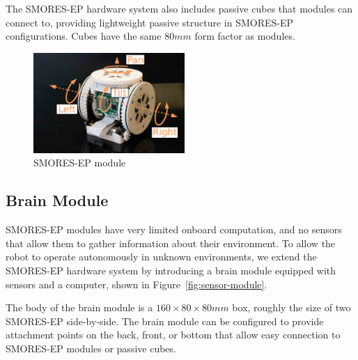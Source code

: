 \documentclass[conference]{IEEEtran}
\begin{document}
The SMORES-EP hardware system also includes passive cubes that modules can connect to, providing lightweight passive structure in SMORES-EP configurations.  Cubes have the same $80mm$ form factor as modules.
%
\begin{figure}   
\begin{center}
\includegraphics[height=1.5in]{images/smores_dof.pdf}
\end{center}
\caption{SMORES-EP module}
\label{fig:smores-module}
\vspace{-2em}
\end{figure}
%

\subsection{Brain Module} %
\label{sec:sensor_module}
%
SMORES-EP modules have very limited onboard computation, and no sensors that allow them to gather information about their environment.  To allow the robot to operate autonomously in unknown environments, we extend the SMORES-EP hardware system by introducing a brain module equipped with sensors and a computer, shown in Figure~\ref{fig:sensor-module}.

The body of the brain module is a $160\times80\times80mm$ box, roughly the size of two SMORES-EP side-by-side.  The brain module can be configured to provide attachment points on the back, front, or bottom that allow easy connection to SMORES-EP modules or passive cubes.
\end{document}

